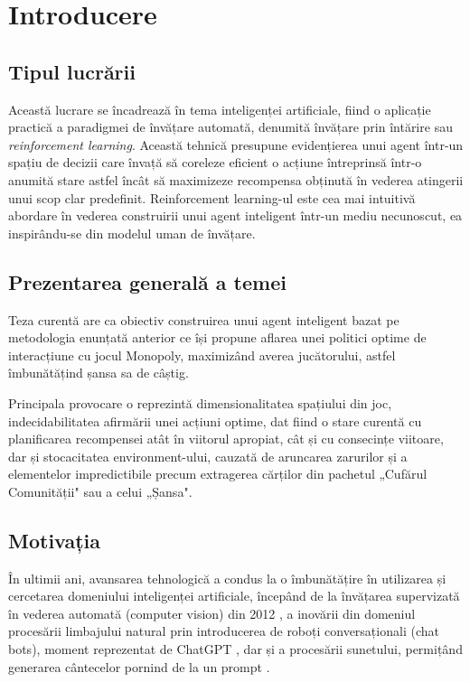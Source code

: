 \chapter{Introducere}

\section{Tipul lucrării}

Această lucrare se încadrează în tema inteligenței artificiale, fiind o aplicație practică a paradigmei de învățare automată, denumită învățare prin întărire sau \textit{reinforcement learning}. Această tehnică presupune evidențierea unui agent într-un spațiu de decizii care învață să coreleze eficient o acțiune întreprinsă într-o anumită stare astfel încât să maximizeze recompensa obținută în vederea atingerii unui scop clar predefinit. Reinforcement learning-ul este cea mai intuitivă abordare în vederea construirii unui agent inteligent într-un mediu necunoscut, ea inspirându-se din modelul uman de învățare.

\section{Prezentarea generală a temei}

Teza curentă are ca obiectiv construirea unui agent inteligent bazat pe metodologia enunțată anterior ce își propune aflarea unei politici optime de interacțiune cu jocul Monopoly, maximizând averea jucătorului, astfel îmbunătățind șansa sa de câștig.

Principala provocare o reprezintă dimensionalitatea spațiului din joc, indecidabilitatea afirmării unei acțiuni optime, dat fiind o stare curentă cu planificarea recompensei atât în viitorul apropiat, cât și cu consecințe viitoare, dar și stocacitatea environment-ului, cauzată de aruncarea zarurilor și a elementelor impredictibile precum extragerea cărților din pachetul „Cufărul Comunității" sau a celui „Șansa".

\section{Motivația}

În ultimii ani, avansarea tehnologică a condus la o îmbunătățire în utilizarea și cercetarea domeniului inteligenței artificiale, începând de la învățarea supervizată în vederea automată (computer vision) din 2012 \cite{alexnet}, a inovării din domeniul procesării limbajului natural prin introducerea de roboți conversaționali (chat bots), moment reprezentat de ChatGPT \cite{chatgpt}, dar și a procesării sunetului, permițând generarea cântecelor pornind de la un prompt \cite{sunoai}.

